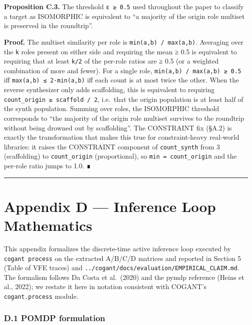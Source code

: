 \documentclass[
]{article}
\begin{document}
\textbf{Proposition C.3.} The threshold \texttt{ε\ ≥\ 0.5} used
throughout the paper to classify a target as ISOMORPHIC is equivalent to
``a majority of the origin role multiset is preserved in the
roundtrip''.

\textbf{Proof.} The multiset similarity per role is
\texttt{min(a,b)\ /\ max(a,b)}. Averaging over the \texttt{k} roles
present on either side and requiring the mean ≥ 0.5 is equivalent to
requiring that at least \texttt{k/2} of the per-role ratios are ≥ 0.5
(or a weighted combination of more and fewer). For a single role,
\texttt{min(a,b)\ /\ max(a,b)\ ≥\ 0.5} iff
\texttt{max(a,b)\ ≤\ 2·min(a,b)} iff each count is at most twice the
other. When the reverse synthesizer only adds scaffolding, this is
equivalent to requiring \texttt{count\_origin\ ≥\ scaffold\ /\ 2},
i.e.~that the origin population is at least half of the synth
population. Summing over roles, the ISOMORPHIC threshold corresponds to
``the majority of the origin role multiset survives to the roundtrip
without being drowned out by scaffolding''. The CONSTRAINT fix (§A.2) is
exactly the transformation that makes this true for constraint-heavy
real-world libraries: it raises the CONSTRAINT component of
\texttt{count\_synth} from 3 (scaffolding) to \texttt{count\_origin}
(proportional), so \texttt{min\ =\ count\_origin} and the per-role ratio
jumps to 1.0. ∎

\begin{center}\rule{0.5\linewidth}{0.5pt}\end{center}

\newpage

\section{Appendix D --- Inference Loop
Mathematics}\label{appendix-d-inference-loop-mathematics}

This appendix formalizes the discrete-time active inference loop
executed by \texttt{cogant\ process} on the extracted A/B/C/D matrices
and reported in Section 5 (Table of VFE traces) and
\texttt{../cogant/docs/evaluation/EMPIRICAL\_CLAIM.md}. The formalism
follows Da Costa et al.~(2020) and the pymdp reference (Heins et al.,
2022); we restate it here in notation consistent with COGANT's
\texttt{cogant.process} module.

\subsubsection{D.1 POMDP formulation}\label{d.1-pomdp-formulation}
\end{document}
